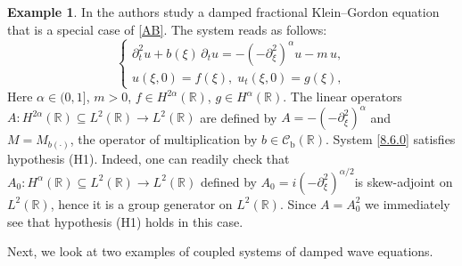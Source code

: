 \documentclass[11pt]{amsart}
\numberwithin{equation}{section}
\newcommand\R{\mathbb R}
\newcommand{\RR}{{\mathbb R}}
\newcommand{\rmb}{{\mathrm{b}}}
\theoremstyle{remark}
\theoremstyle{definition}
\newtheorem{example}[theorem]{Example}
\newcommand\cC{{\mathcal C}}
\begin{document}
\begin{example}\label{e8.6}
	In \cite{MS} the authors study a damped fractional Klein--Gordon
	equation that is a special case of \eqref{AB}. The system reads as follows:
	\begin{equation}\label{8.6.0}
		\begin{cases}
			\partial_t^2 u + b(\xi)\,\partial_t u = -(-\partial_\xi^2)^\alpha u - m\,u,\\
			u(\xi,0) = f(\xi),\; 
			u_t(\xi,0) = g(\xi), 
		\end{cases}
	\end{equation}
	Here $\alpha \in (0,1]$, $m > 0$, $f \in H^{2\alpha}(\R)$,
	$g \in H^\alpha(\R)$. The linear operators $A:H^{2\alpha}(\RR)\subseteq L^2(\RR)\to L^2(\RR)$ are defined by $A=-(-\partial_\xi^2)^\alpha$ and $M=M_{b(\cdot)}$, the operator of multiplication by $b\in\cC_\rmb(\RR)$.  System \eqref{8.6.0} satisfies hypothesis (H1). Indeed, one can readily check that $A_0:H^{\alpha}(\RR)\subseteq L^2(\RR)\to L^2(\RR)$ defined by $A_0 = i(-\partial_\xi^2)^{\alpha/2}$is skew-adjoint on $L^2(\RR)$, hence it is a group generator on $L^2(\R)$. Since $A=A_0^2$ we immediately see that hypothesis (H1) holds in this case.
\end{example}
Next, we look at two examples of coupled systems of damped wave equations.
\end{document}
